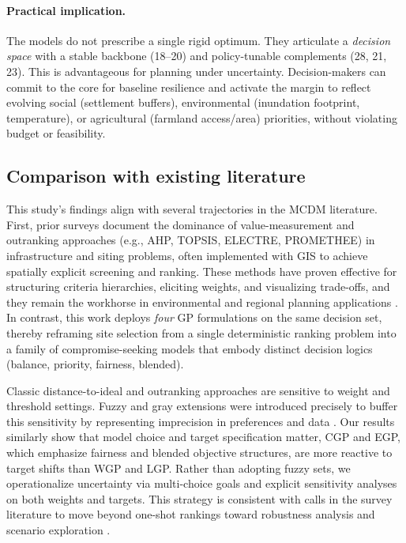 \paragraph{Practical implication.}
The models do not prescribe a single rigid optimum. They articulate a \textit{decision space} with a stable backbone (18--20) and policy-tunable complements (28, 21, 23). This is advantageous for planning under uncertainty. Decision-makers can commit to the core for baseline resilience and activate the margin to reflect evolving social (settlement buffers), environmental (inundation footprint, temperature), or agricultural (farmland access/area) priorities, without violating budget or feasibility.


\subsection{Comparison with existing literature}
This study's findings align with several trajectories in the \gls{MCDM} literature. First, prior surveys document the dominance of value-measurement and outranking approaches (e.g., \gls{AHP}, \gls{TOPSIS}, \gls{ELECTRE}, \gls{PROMETHEE}) in infrastructure and siting problems, often implemented with GIS to achieve spatially explicit screening and ranking. These methods have proven effective for structuring criteria hierarchies, eliciting weights, and visualizing trade-offs, and they remain the workhorse in environmental and regional planning applications \cite{Aruldoss2013,Taherdoost2023}. In contrast, this work deploys \textit{four} \gls{GP} formulations on the same decision set, thereby reframing site selection from a single deterministic ranking problem into a family of compromise-seeking models that embody distinct decision logics (balance, priority, fairness, blended)\cite{jones2010}.

Classic distance-to-ideal and outranking approaches are sensitive to weight and threshold settings. Fuzzy and gray extensions were introduced precisely to buffer this sensitivity by representing imprecision in preferences and data \cite{LIANG1999,Mardani2015}. Our results similarly show that model choice and target specification matter, CGP and EGP, which emphasize fairness and blended objective structures, are more reactive to target shifts than WGP and LGP. Rather than adopting fuzzy sets, we operationalize uncertainty via multi-choice goals and explicit sensitivity analyses on both weights and targets. This strategy is consistent with calls in the survey literature to move beyond one-shot rankings toward robustness analysis and scenario exploration \cite{Aruldoss2013,Taherdoost2023}.

